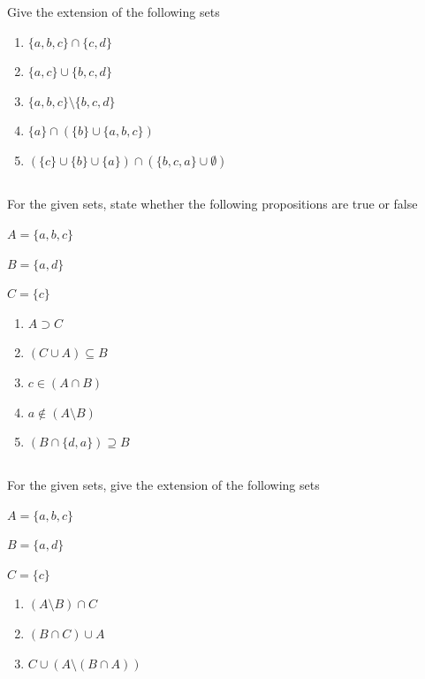 \documentclass[twocolumn]{article}
\begin{document}
    Give the extension of the following sets

    \begin{enumerate}
        \item $\{ a, b, c \} \cap \{ c, d \} $
        \item $\{ a, c \} \cup \{ b, c, d \} $
        \item $\{ a, b, c \} \setminus \{ b, c, d \} $
        \item $\{ a \} \cap ( \{ b \} \cup \{a, b, c\} ) $
        \item $ (\{ c \} \cup \{ b \} \cup \{a\}) \cap ( \{b, c, a\} \cup \emptyset ) $
    \end{enumerate}

\subsection{}

    For the given sets, state whether the following propositions are true or false

    $ A = \{ a, b, c \} $

    $ B = \{ a, d \} $

    $ C = \{ c \} $

    \begin{enumerate}
        \item $ A \supset C $
        \item $ (C \cup A) \subseteq B $
        \item $ c \in ( A \cap B ) $
        \item $ a \not \in ( A \setminus B ) $
        \item $(B \cap \{d, a\} ) \supseteq B$
    \end{enumerate}

\subsection{}

    For the given sets, give the extension of the following sets

    $ A = \{ a, b, c \} $

    $ B = \{ a, d \} $

    $ C = \{ c \} $

    \begin{enumerate}
        \item $ (A \setminus B) \cap C$
        \item $ ( B \cap C ) \cup A $
        \item $ C \cup (A \setminus (B \cap A)) $
    \end{enumerate}
\end{document}

